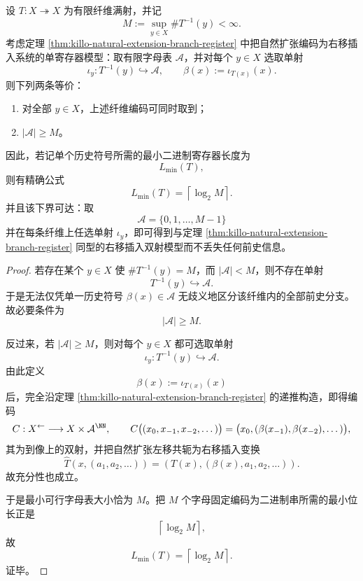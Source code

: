 \begin{proposition}[自然扩张单寄存器实现的最小字母表与二进长度]\label{prop:xi-natural-extension-single-register-minimal-alphabet}
设 \(T:X\twoheadrightarrow X\) 为有限纤维满射，并记
\[
M:=\sup_{y\in X}\#T^{-1}(y)<\infty.
\]
考虑定理 \ref{thm:killo-natural-extension-branch-register} 中把自然扩张编码为右移插入系统的单寄存器模型：取有限字母表 \(\mathcal A\)，并对每个 \(y\in X\) 选取单射
\[
\iota_y:T^{-1}(y)\hookrightarrow \mathcal A,
\qquad
\beta(x):=\iota_{T(x)}(x).
\]
则下列两条等价：
\begin{enumerate}
  \item 对全部 \(y\in X\)，上述纤维编码可同时取到；
  \item \(|\mathcal A|\ge M\)。
\end{enumerate}
因此，若记单个历史符号所需的最小二进制寄存器长度为
\[
L_{\min}(T),
\]
则有精确公式
\[
\boxed{\;
L_{\min}(T)=\left\lceil \log_2 M \right\rceil.\;}
\]
并且该下界可达：取
\[
\mathcal A=\{0,1,\dots,M-1\}
\]
并在每条纤维上任选单射 \(\iota_y\)，即可得到与定理 \ref{thm:killo-natural-extension-branch-register} 同型的右移插入双射模型而不丢失任何前史信息。
\end{proposition}
\begin{proof}
若存在某个 \(y\in X\) 使 \(\#T^{-1}(y)=M\)，而 \(|\mathcal A|<M\)，则不存在单射
\[
T^{-1}(y)\hookrightarrow \mathcal A.
\]
于是无法仅凭单一历史符号 \(\beta(x)\in\mathcal A\) 无歧义地区分该纤维内的全部前史分支。故必要条件为
\[
|\mathcal A|\ge M.
\]

反过来，若 \(|\mathcal A|\ge M\)，则对每个 \(y\in X\) 都可选取单射
\[
\iota_y:T^{-1}(y)\hookrightarrow \mathcal A.
\]
由此定义
\[
\beta(x):=\iota_{T(x)}(x)
\]
后，完全沿定理 \ref{thm:killo-natural-extension-branch-register} 的递推构造，即得编码
\[
C:X^{\leftarrow}\longrightarrow X\times \mathcal A^{\NN},
\qquad
C\bigl((x_0,x_{-1},x_{-2},\dots)\bigr)
=
\bigl(x_0,(\beta(x_{-1}),\beta(x_{-2}),\dots)\bigr),
\]
其为到像上的双射，并把自然扩张左移共轭为右移插入变换
\[
\widehat T(x,(a_1,a_2,\dots))=(T(x),(\beta(x),a_1,a_2,\dots)).
\]
故充分性也成立。

于是最小可行字母表大小恰为 \(M\)。把 \(M\) 个字母固定编码为二进制串所需的最小位长正是
\[
\left\lceil \log_2 M \right\rceil,
\]
故
\[
L_{\min}(T)=\left\lceil \log_2 M \right\rceil.
\]
证毕。
\end{proof}





